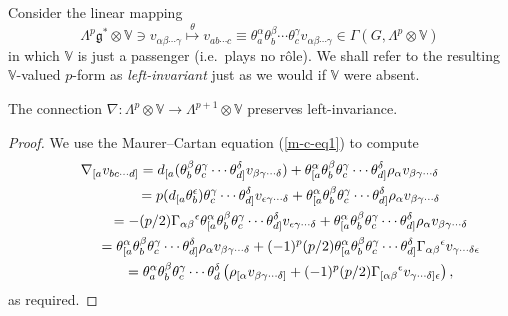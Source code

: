 \documentclass[pdftex]{sigma}
\begin{document}
Consider the linear mapping
\[\Lambda^p{\mathfrak{g}}^*\otimes{\mathbb{V}}\ni v_{\alpha\beta\cdots\gamma}
\stackrel{\theta}{\longmapsto}v_{ab\cdots c}\equiv
\theta_a^\alpha\theta_b^\beta\cdots\theta_c^\gamma
v_{\alpha\beta\cdots\gamma}\in\Gamma(G,\Lambda^p\otimes{\mathbb{V}})\]
in which ${\mathbb{V}}$ is just a passenger (i.e.~plays no r\^{o}le). We shall
refer to the resulting ${\mathbb{V}}$-valued $p$-form as {\em left-invariant\/}
just as we would if ${\mathbb{V}}$ were absent.
\begin{lemma} The connection
$\nabla:\Lambda^p\otimes{\mathbb{V}}\to\Lambda^{p+1}\otimes{\mathbb{V}}$
preserves left-invariance.\end{lemma}
\begin{proof}We use the Maurer--Cartan equation (\ref{m-c-eq1}) to compute
\begin{gather}
\nabla_{[a}v_{bc\cdots d]} =d_{[a}(\theta_b^\beta\theta_c^\gamma\cdots\theta_{d]}^\delta
v_{\beta\gamma\cdots\delta})+
\theta_{[a}^\alpha\theta_b^\beta\theta_c^\gamma\cdots\theta_{d]}^\delta
\rho_\alpha v_{\beta\gamma\cdots\delta}
\nonumber\\
 \hphantom{\nabla_{[a}v_{bc\cdots d]}}{} = p(d_{[a}\theta_b^\epsilon)\theta_c^\gamma\cdots\theta_{d]}^\delta
v_{\epsilon\gamma\cdots\delta}+
\theta_{[a}^\alpha\theta_b^\beta\theta_c^\gamma\cdots\theta_{d]}^\delta
\rho_\alpha v_{\beta\gamma\cdots\delta}
\nonumber\\
 \hphantom{\nabla_{[a}v_{bc\cdots d]}}{} =-(p/2)\Gamma_{\alpha\beta}{}^\epsilon
\theta_{[a}^\alpha\theta_b^\beta\theta_c^\gamma\cdots\theta_{d]}^\delta
v_{\epsilon\gamma\cdots\delta}+
\theta_{[a}^\alpha\theta_b^\beta\theta_c^\gamma\cdots\theta_{d]}^\delta
\rho_\alpha v_{\beta\gamma\cdots\delta}
\nonumber\\
 \hphantom{\nabla_{[a}v_{bc\cdots d]}}{} =\theta_{[a}^\alpha\theta_b^\beta\theta_c^\gamma\cdots\theta_{d]}^\delta
\rho_\alpha v_{\beta\gamma\cdots\delta}
+(-1)^p(p/2)
\theta_{[a}^\alpha\theta_b^\beta\theta_c^\gamma\cdots\theta_{d]}^\delta
\Gamma_{\alpha\beta}{}^\epsilon v_{\gamma\cdots\delta\epsilon}
\nonumber\\
 \hphantom{\nabla_{[a}v_{bc\cdots d]}}{} = \theta_a^\alpha\theta_b^\beta\theta_c^\gamma\cdots\theta_d^\delta
\left(\rho_{[\alpha}v_{\beta\gamma\cdots\delta]}
+(-1)^p(p/2)
\Gamma_{[\alpha\beta}{}^\epsilon v_{\gamma\cdots\delta]\epsilon}\right),\label{key}
\end{gather}
as required.
\end{proof}
\end{document}
